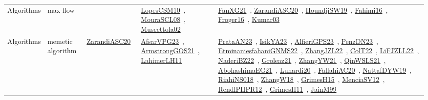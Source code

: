 {\begin{longtable}{lp{3cm}>{\raggedright\arraybackslash}p{6cm}>{\raggedright\arraybackslash}p{6cm}>{\raggedright\arraybackslash}p{8cm}}
Algorithms & max-flow &  & \href{../works/LopesCSM10.pdf}{LopesCSM10}~\cite{LopesCSM10}, \href{../works/MouraSCL08.pdf}{MouraSCL08}~\cite{MouraSCL08}, \href{../works/Muscettola02.pdf}{Muscettola02}~\cite{Muscettola02} & \href{../works/FanXG21.pdf}{FanXG21}~\cite{FanXG21}, \href{../works/ZarandiASC20.pdf}{ZarandiASC20}~\cite{ZarandiASC20}, \href{../works/HoundjiSW19.pdf}{HoundjiSW19}~\cite{HoundjiSW19}, \href{../works/Fahimi16.pdf}{Fahimi16}~\cite{Fahimi16}, \href{../works/Froger16.pdf}{Froger16}~\cite{Froger16}, \href{../works/Kumar03.pdf}{Kumar03}~\cite{Kumar03}\\
Algorithms & memetic algorithm & \href{../works/ZarandiASC20.pdf}{ZarandiASC20}~\cite{ZarandiASC20} & \href{../works/AfsarVPG23.pdf}{AfsarVPG23}~\cite{AfsarVPG23}, \href{../works/ArmstrongGOS21.pdf}{ArmstrongGOS21}~\cite{ArmstrongGOS21}, \href{../works/LahimerLH11.pdf}{LahimerLH11}~\cite{LahimerLH11} & \href{../works/PrataAN23.pdf}{PrataAN23}~\cite{PrataAN23}, \href{../works/IsikYA23.pdf}{IsikYA23}~\cite{IsikYA23}, \href{../works/AlfieriGPS23.pdf}{AlfieriGPS23}~\cite{AlfieriGPS23}, \href{../works/PenzDN23.pdf}{PenzDN23}~\cite{PenzDN23}, \href{../works/EtminaniesfahaniGNMS22.pdf}{EtminaniesfahaniGNMS22}~\cite{EtminaniesfahaniGNMS22}, \href{../works/ZhangJZL22.pdf}{ZhangJZL22}~\cite{ZhangJZL22}, \href{../works/ColT22.pdf}{ColT22}~\cite{ColT22}, \href{../works/LiFJZLL22.pdf}{LiFJZLL22}~\cite{LiFJZLL22}, \href{../works/NaderiBZ22.pdf}{NaderiBZ22}~\cite{NaderiBZ22}, \href{../works/Groleaz21.pdf}{Groleaz21}~\cite{Groleaz21}, \href{../works/ZhangYW21.pdf}{ZhangYW21}~\cite{ZhangYW21}, \href{../works/QinWSLS21.pdf}{QinWSLS21}~\cite{QinWSLS21}, \href{../works/AbohashimaEG21.pdf}{AbohashimaEG21}~\cite{AbohashimaEG21}, \href{../works/Lunardi20.pdf}{Lunardi20}~\cite{Lunardi20}, \href{../works/FallahiAC20.pdf}{FallahiAC20}~\cite{FallahiAC20}, \href{../works/NattafDYW19.pdf}{NattafDYW19}~\cite{NattafDYW19}, \href{../works/RiahiNS018.pdf}{RiahiNS018}~\cite{RiahiNS018}, \href{../works/ZhangW18.pdf}{ZhangW18}~\cite{ZhangW18}, \href{../works/GrimesH15.pdf}{GrimesH15}~\cite{GrimesH15}, \href{../works/MenciaSV12.pdf}{MenciaSV12}~\cite{MenciaSV12}, \href{../works/RendlPHPR12.pdf}{RendlPHPR12}~\cite{RendlPHPR12}, \href{../works/GrimesH11.pdf}{GrimesH11}~\cite{GrimesH11}, \href{../works/JainM99.pdf}{JainM99}~\cite{JainM99}\\

\end{longtable}}
